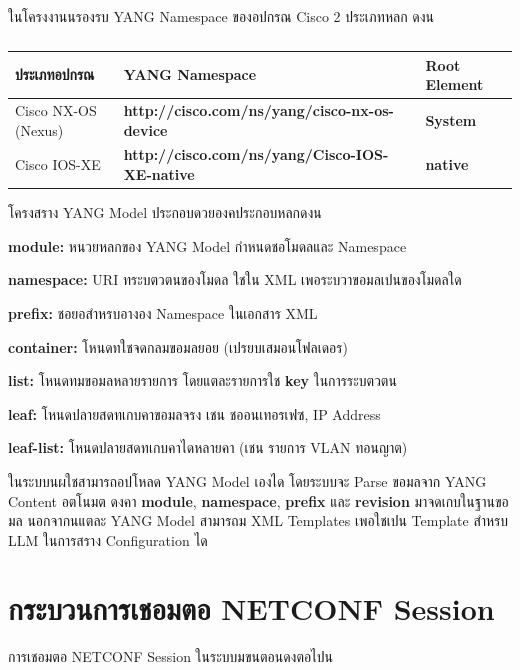 \hspace*{1.3em}
ในโครงงานนรองรบ YANG Namespace ของอปกรณ Cisco 2 ประเภทหลก ดงน

\begin{table}[H]
\centering
\caption{}
\label{tabD:YangNamespaces}
\begin{tabularx}{\textwidth}{|l|X|l|}
\hline
\textbf{ประเภทอปกรณ} & \textbf{YANG Namespace} & \textbf{Root Element} \\
\hline
Cisco NX-OS (Nexus) & \textbf{http://cisco.com/ns/yang/cisco-nx-os-device} & \textbf{System} \\
\hline
Cisco IOS-XE & \textbf{http://cisco.com/ns/yang/Cisco-IOS-XE-native} & \textbf{native} \\
\hline
\end{tabularx}
\end{table}

\hspace*{1.3em}
โครงสราง YANG Model ประกอบดวยองคประกอบหลกดงน

\begin{mycustomenum2}
    \item \textbf{module:} หนวยหลกของ YANG Model กำหนดชอโมดลและ Namespace
    \item \textbf{namespace:} URI ทระบตวตนของโมดล ใชใน XML เพอระบวาขอมลเปนของโมดลใด
    \item \textbf{prefix:} ชอยอสำหรบอางอง Namespace ในเอกสาร XML
    \item \textbf{container:} โหนดทใชจดกลมขอมลยอย (เปรยบเสมอนโฟลเดอร)
    \item \textbf{list:} โหนดทมขอมลหลายรายการ โดยแตละรายการใช \textbf{key} ในการระบตวตน
    \item \textbf{leaf:} โหนดปลายสดทเกบคาขอมลจรง เชน ชออนเทอรเฟซ, IP Address
    \item \textbf{leaf-list:} โหนดปลายสดทเกบคาไดหลายคา (เชน รายการ VLAN ทอนญาต)
\end{mycustomenum2}

\hspace*{1.3em}
ในระบบนผใชสามารถอปโหลด YANG Model เองได โดยระบบจะ Parse ขอมลจาก YANG Content อตโนมต ดงคา \textbf{module}, \textbf{namespace}, \textbf{prefix} และ \textbf{revision} มาจดเกบในฐานขอมล นอกจากนแตละ YANG Model สามารถม XML Templates เพอใชเปน Template สำหรบ LLM ในการสราง Configuration ได

\section{กระบวนการเชอมตอ NETCONF Session}
\hspace*{1.3em}
การเชอมตอ NETCONF Session ในระบบมขนตอนดงตอไปน

